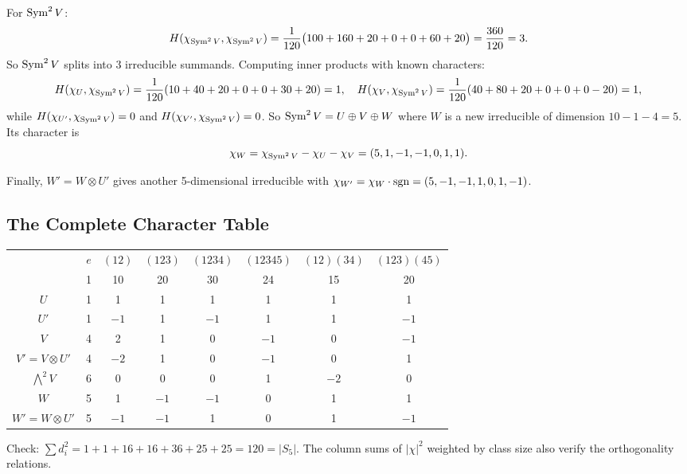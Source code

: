 \documentclass{report}
\begin{document}
For \(\operatorname{Sym}^2 V\):
\[H(\chi_{\operatorname{Sym}^2 V}, \chi_{\operatorname{Sym}^2 V}) = \frac{1}{120}\bigl(100 + 160 + 20 + 0 + 0 + 60 + 20\bigr) = \frac{360}{120} = 3.\]
So \(\operatorname{Sym}^2 V\) splits into 3 irreducible summands. Computing inner products with known characters:
\[H(\chi_U, \chi_{\operatorname{Sym}^2 V}) = \frac{1}{120}(10+40+20+0+0+30+20) = 1, \quad H(\chi_V, \chi_{\operatorname{Sym}^2 V}) = \frac{1}{120}(40+80+20+0+0+0-20) = 1,\]
while \(H(\chi_{U'}, \chi_{\operatorname{Sym}^2 V}) = 0\) and \(H(\chi_{V'}, \chi_{\operatorname{Sym}^2 V}) = 0\). So \(\operatorname{Sym}^2 V = U \oplus V \oplus W\) where \(W\) is a new irreducible of dimension \(10 - 1 - 4 = 5\). Its character is
\[\chi_W = \chi_{\operatorname{Sym}^2 V} - \chi_U - \chi_V = (5, 1, -1, -1, 0, 1, 1).\]

Finally, \(W' = W \otimes U'\) gives another 5-dimensional irreducible with \(\chi_{W'} = \chi_W \cdot \operatorname{sgn} = (5, -1, -1, 1, 0, 1, -1)\).

\subsection{The Complete Character Table}

\begin{center}
\begin{tabular}{c|ccccccc}
& \(e\) & \((12)\) & \((123)\) & \((1234)\) & \((12345)\) & \((12)(34)\) & \((123)(45)\) \\
& 1 & 10 & 20 & 30 & 24 & 15 & 20 \\ \hline
\(U\) & 1 & 1 & 1 & 1 & 1 & 1 & 1 \\
\(U'\) & 1 & \(-1\) & 1 & \(-1\) & 1 & 1 & \(-1\) \\
\(V\) & 4 & 2 & 1 & 0 & \(-1\) & 0 & \(-1\) \\
\(V' = V \otimes U'\) & 4 & \(-2\) & 1 & 0 & \(-1\) & 0 & 1 \\
\(\bigwedge^2 V\) & 6 & 0 & 0 & 0 & 1 & \(-2\) & 0 \\
\(W\) & 5 & 1 & \(-1\) & \(-1\) & 0 & 1 & 1 \\
\(W' = W \otimes U'\) & 5 & \(-1\) & \(-1\) & 1 & 0 & 1 & \(-1\)
\end{tabular}
\end{center}

Check: \(\sum d_i^2 = 1 + 1 + 16 + 16 + 36 + 25 + 25 = 120 = |S_5|\). The column sums of \(|\chi|^2\) weighted by class size also verify the orthogonality relations.

\end{document}
